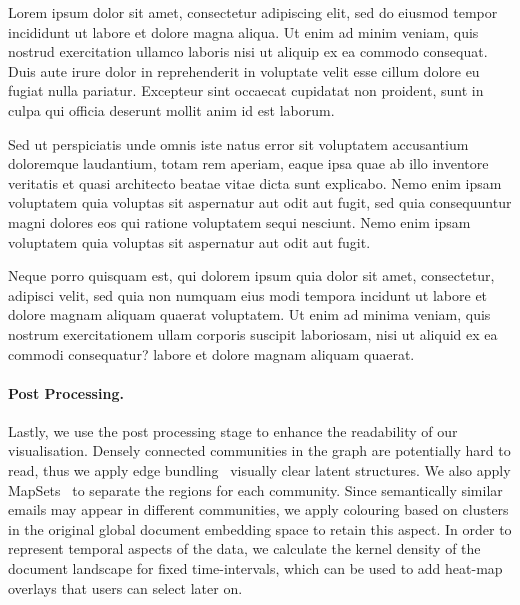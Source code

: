 Lorem ipsum dolor sit amet, consectetur adipiscing elit, sed do eiusmod tempor incididunt ut labore et dolore magna aliqua. Ut enim ad minim veniam, quis nostrud exercitation ullamco laboris nisi ut aliquip ex ea commodo consequat. Duis aute irure dolor in reprehenderit in voluptate velit esse cillum dolore eu fugiat nulla pariatur. Excepteur sint occaecat cupidatat non proident, sunt in culpa qui officia deserunt mollit anim id est laborum.

Sed ut perspiciatis unde omnis iste natus error sit voluptatem accusantium doloremque laudantium, totam rem aperiam, eaque ipsa quae ab illo inventore veritatis et quasi architecto beatae vitae dicta sunt explicabo. Nemo enim ipsam voluptatem quia voluptas sit aspernatur aut odit aut fugit, sed quia consequuntur magni dolores eos qui ratione voluptatem sequi nesciunt. Nemo enim ipsam voluptatem quia voluptas sit aspernatur aut odit aut fugit. 

Neque porro quisquam est, qui dolorem ipsum quia dolor sit amet, consectetur, adipisci velit, sed quia non numquam eius modi tempora incidunt ut labore et dolore magnam aliquam quaerat voluptatem. Ut enim ad minima veniam, quis nostrum exercitationem ullam corporis suscipit laboriosam, nisi ut aliquid ex ea commodi consequatur?   labore et dolore magnam aliquam quaerat.

\paragraph{Post Processing.}
Lastly, we use the post processing stage to enhance the readability of our visualisation.
Densely connected communities in the graph are potentially hard to read, thus we apply edge bundling~\cite{bach2017towards} visually clear latent structures.
We also apply MapSets~\cite{efrat2015mapsets} to separate the regions for each community.
Since semantically similar emails may appear in different communities, we apply colouring based on clusters in the original global document embedding space to retain this aspect.
In order to represent temporal aspects of the data, we calculate the kernel density of the document landscape for fixed time-intervals, which can be used to add heat-map overlays that users can select later on. 


